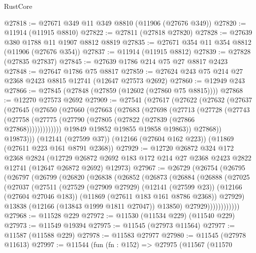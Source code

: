 \begin{lexlean}{RustCore}
\begin{coremodule}
@27818 := @27671 @349 @11 @349 @8810 (@11906 (@27676 @349))
@27820 := @11914 (@11915 @8810)
@27822 := @27811 (@27818 @27820)
@27828 := @27639 @380 @1788 @11 @1907 @8812 @8819
@27835 := @27671 @354 @11 @354 @8812 (@11906 (@27676 @354))
@27837 := @11914 (@11915 @8812)
@27839 := @27828 (@27835 @27837)
@27845 := @27639 @1786 @214 @75 @27 @8817 @2423
@27848 := @27647 @1786 @75 @8817
@27859 := @27624 @243 @75 @214 @27 @2368 @2423 @8815 @12741 (@12647 @27573 @2692)
@27860 := @12949 @243
@27866 := @27845 (@27848 (@27859 (@12602 (@27860 @75 @8815))))
@27868 := @12270 @27573 @2692
@27909 := @27541
    (@27617
      (@27622
        (@27632
          (@27637
            (@27645
              (@27650
                (@27660
                  (@27663
                    (@27683
                      (@27698
                        (@27713
                          (@27728
                            (@27743
                              (@27758
                                (@27775 (@27790 (@27805 (@27822 (@27839 (@27866 @27868)))))))))))))
                  @19849
                  @19852
                  @19855
                  @19858
                  @19863))
              @27868))
          @19873)))
    (@12141 (@27599 @37))
    (@12166 (@27604 @162 @223))
    (@11869 (@27611 @223 @161 @8791 @2368))
@27929 := @12720
    @26872
    @324
    @172
    @2368
    @2824
    (@12729 @26872 @2692 @183 @172 @214 @27 @2368 @2423 @2822 @12741 (@12647 @26872 @2692) @12973)
@27967 := @26729
    (@26754
      (@26795
        (@26797
          (@26799
            (@26820
              (@26838
                (@26852
                  (@26873
                    (@26884
                      (@26888
                        (@27025
                          (@27037
                            (@27511
                              (@27529
                                (@27909 @27929)
                                (@12141 (@27599 @23))
                                (@12166 (@27604 @27046 @183))
                                (@11869 (@27611 @183 @161 @8786 @2368))
                                @27929)
                              @13838
                              (@12166 (@13843 @1999 @1811 @27047))
                              @13850)
                            @27929))))))))))))
@27968 := @11528 @229
@27972 := @11530 (@11534 @229) (@11540 @229)
@27973 := @11549 @19394
@27975 := @11545 (@27973 @11564)
@27977 := @11587 (@11588 @229)
@27978 := @11583 @27977
@27980 := @11545 (@27978 @11613)
@27997 := @11544
    (fun (fn : @152) =>
    @27975
      (@11567
        (@11570

\end{coremodule}
\end{lexlean}
